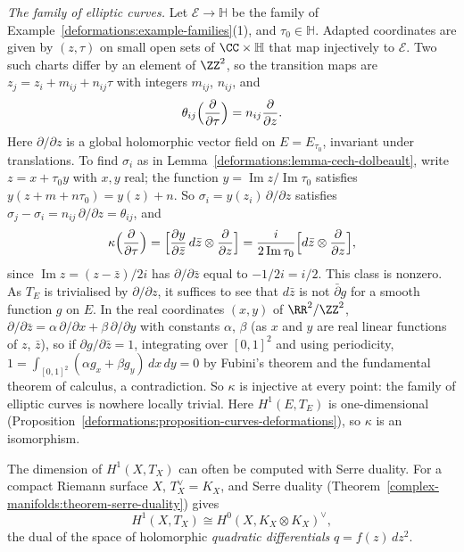 \begin{example}\label{deformations:example-kodaira-spencer-elliptic}
\emph{The family of elliptic curves.} Let $\mathcal{E} \to \mathbb{H}$ be the family of Example~\ref{deformations:example-families}(1), and $\tau_0 \in \mathbb{H}$. Adapted coordinates are given by $(z, \tau)$ on small open
sets of $\CC \times \mathbb{H}$ that map injectively to $\mathcal{E}$. Two such charts differ by an element of $\ZZ^2$, so the transition maps are $z_j = z_i + m_{ij} + n_{ij}\tau$ with integers $m_{ij}$, $n_{ij}$,
and
\[
\theta_{ij}\Bigl(\frac{\partial}{\partial\tau}\Bigr) = n_{ij}\frac{\partial}{\partial z}.
\]
Here $\partial/\partial z$ is a global holomorphic vector field on $E = E_{\tau_0}$, invariant under translations. To find $\sigma_i$ as in Lemma~\ref{deformations:lemma-cech-dolbeault}, write $z = x + \tau_0y$ with $x, y$ real;
the function $y = \operatorname{Im}z/\operatorname{Im}\tau_0$ satisfies $y(z + m + n\tau_0) = y(z) + n$. So $\sigma_i = y(z_i)\,\partial/\partial z$ satisfies $\sigma_j - \sigma_i = n_{ij}\,\partial/\partial z = \theta_{ij}$, and
\[
\kappa\Bigl(\frac{\partial}{\partial\tau}\Bigr) = \Bigl[\frac{\partial y}{\partial\bar z}\,d\bar z \otimes \frac{\partial}{\partial z}\Bigr] = \frac{i}{2\operatorname{Im}\tau_0}\Bigl[d\bar z \otimes \frac{\partial}{\partial z}\Bigr],
\]
since $\operatorname{Im}z = (z - \bar z)/2i$ has $\partial/\partial\bar z$ equal to $-1/2i = i/2$. This class is nonzero. As $T_E$ is trivialised by $\partial/\partial z$, it suffices to see that $d\bar z$ is not
$\bar\partial g$ for a smooth function $g$ on $E$. In the real coordinates $(x, y)$ of $\RR^2/\ZZ^2$, $\partial/\partial\bar z = \alpha\,\partial/\partial x + \beta\,\partial/\partial y$ with constants $\alpha$, $\beta$ (as $x$ and $y$
are real linear functions of $z$, $\bar z$), so if $\partial g/\partial\bar z = 1$, integrating over $[0, 1]^2$ and using periodicity, $1 = \int_{[0,1]^2}(\alpha g_x + \beta g_y)\,dx\,dy = 0$ by Fubini's theorem and the
fundamental theorem of calculus, a contradiction. So $\kappa$ is injective at every point: the family of elliptic curves is nowhere locally trivial. Here $H^1(E, T_E)$ is one-dimensional
(Proposition~\ref{deformations:proposition-curves-deformations}), so $\kappa$ is an isomorphism.
\end{example}

The dimension of $H^1(X, T_X)$ can often be computed with Serre duality. For a compact Riemann surface $X$, $T_X^\vee = K_X$, and Serre duality (Theorem~\ref{complex-manifolds:theorem-serre-duality}) gives
\[
H^1(X, T_X) \cong H^0(X, K_X \otimes K_X)^\vee,
\]
the dual of the space of holomorphic \emph{quadratic differentials} $q = f(z)\,dz^2$.

